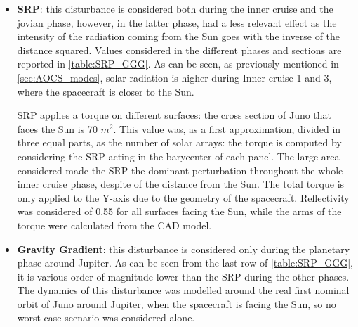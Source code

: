 \begin{itemize}
    \item \textbf{SRP}: this disturbance is considered both during the inner cruise and the jovian phase, however, in the latter phase, had a less relevant effect as the intensity of the radiation coming from the Sun goes with the inverse of the distance squared. Values considered in the different phases and sections are reported in \autoref{table:SRP_GGG}. As can be seen, as previously mentioned in \autoref{sec:AOCS_modes}, solar radiation is higher during Inner cruise 1 and 3, where the spacecraft is closer to the Sun. 
    

    SRP applies a torque on different surfaces: the cross section of Juno that faces the Sun is 70 $m^2$. This value was, as a first approximation, divided in three equal parts, as the number of solar arrays: the torque is computed by considering the SRP acting in the barycenter of each panel. The large area considered made the SRP the dominant perturbation throughout the whole inner cruise phase, despite of the distance from the Sun. The total torque is only applied to the Y-axis due to the geometry of the spacecraft. Reflectivity was considered of 0.55 for all surfaces facing the Sun, while the arms of the torque were calculated from the CAD model. 

    \item \textbf{Gravity Gradient}: this disturbance is considered only during the planetary phase around Jupiter. As can be seen from the last row of \autoref{table:SRP_GGG}, it is various order of magnitude lower than the SRP during the other phases.  The dynamics of this disturbance was modelled around the real first nominal orbit of Juno around Jupiter, when the spacecraft is facing the Sun, so no worst case scenario was considered alone.   %
    

\end{itemize}
